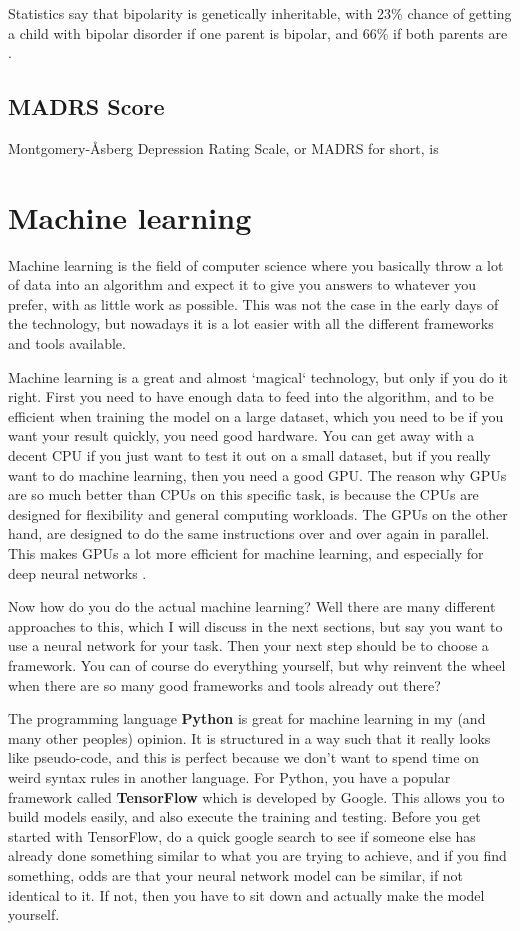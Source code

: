 Statistics say that bipolarity is genetically inheritable, with 23\% chance of getting a child with bipolar disorder 
if one parent is bipolar, and 66\% if both parents are \cite{bipolar_statistics}. 

\subsection{MADRS Score}
Montgomery-Åsberg Depression Rating Scale, or MADRS for short, is 


\newpage
\section{Machine learning}
Machine learning is the field of computer science where you basically throw a lot of data into an algorithm
and expect it to give you answers to whatever you prefer, with as little work as possible. 
This was not the case in the early days of the technology, but nowadays it is a lot easier with all the different 
frameworks and tools available.

Machine learning is a great and almost `magical` technology, but only if you do it right.
First you need to have enough data to feed into the algorithm, and to be efficient when training the model on a 
large dataset, which you need to be if you want your result quickly, you need good hardware. You can get away with a 
decent CPU if you just want to test it out on a small dataset, but if you really want to do machine learning,
then you need a good GPU. The reason why GPUs are so much better than CPUs on this specific task, 
is because the CPUs are designed for flexibility and general computing workloads. The GPUs on the other hand, 
are designed to do the same instructions over and over again in parallel. This makes GPUs a lot more efficient for 
machine learning, and especially for deep neural networks \cite{cpu_vs_gpu_ml}. 

Now how do you do the actual machine learning? Well there are many different approaches to this, which I will discuss 
in the next sections, but say you want to use a neural network for your task. Then your next step should be to 
choose a framework. You can of course do everything yourself, but why reinvent the wheel when there are so many good 
frameworks and tools already out there? 

The programming language \textbf{Python} is great for machine learning in my (and many other peoples) opinion. 
It is structured in a way such that it really looks like pseudo-code, and this is perfect because we don't want to 
spend time on weird syntax rules in another language. For Python, you have a popular framework called \textbf{TensorFlow} 
which is developed by Google. This allows you to build models easily, and also execute the training and testing. 
Before you get started with TensorFlow, do a quick google search to see if someone else has already done something 
similar to what you are trying to achieve, and if you find something, odds are that your neural network model can be 
similar, if not identical to it. If not, then you have to sit down and actually make the model yourself. 

